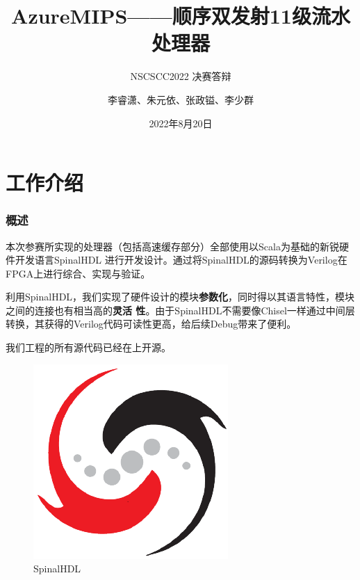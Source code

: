 \documentclass{beamer}
\author{李睿潇、朱元依、张政镒、李少群}
\title{AzureMIPS——顺序双发射11级流水处理器}
\subtitle{NSCSCC2022 决赛答辩}
\institute{复旦大学}
\date{2022年8月20日}
\begin{document}
    
\begin{frame}
    \titlepage
\end{frame}

\begin{frame}
    \tableofcontents[sectionstyle=show,subsectionstyle=show/shaded/hide,subsubsectionstyle=show/shaded/hide]
\end{frame}

\section{工作介绍}

\begin{frame}
    \frametitle{概述}

    \begin{minipage}[c]{0.7\linewidth}
    本次参赛所实现的处理器（包括高速缓存部分）全部使用以Scala为基础的新锐硬件开发语言SpinalHDL
    进行开发设计。通过将SpinalHDL的源码转换为Verilog在FPGA上进行综合、实现与验证。

    利用SpinalHDL，我们实现了硬件设计的模块\textbf{参数化}，同时得以其语言特性，模块之间的连接也有相当高的\textbf{灵活
    性}。由于SpinalHDL不需要像Chisel一样通过中间层转换，其获得的Verilog代码可读性更高，给后续Debug带来了便利。

    我们工程的所有源代码已经在\href{https://github.com/0xtaruhi/AzureMIPS}{\color{deepblue}{GitHub}}上开源。
    \end{minipage}\hfill
    \begin{minipage}{0.25\linewidth}
        \begin{figure}
            \centering
            \includegraphics[width=\linewidth]{pic/SpinalHDL.png}
            \caption{SpinalHDL}
        \end{figure}
    \end{minipage}


\end{frame}
\end{document}
